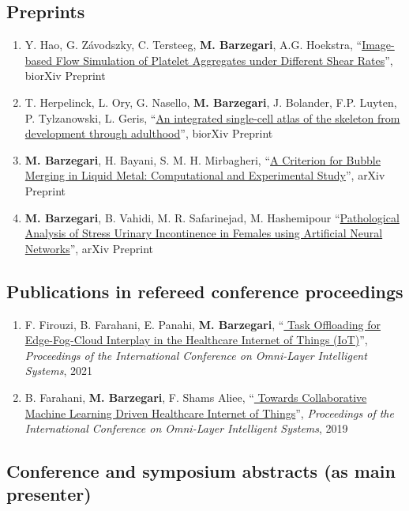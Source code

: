 \documentclass{cv}
\begin{document}
\subsection{Preprints}
\begin{enumerate}[itemsep=-0.2ex]
\item
Y. Hao, G. Závodszky, C. Tersteeg, \textbf{M. Barzegari}, A.G. Hoekstra, ``\href{https://doi.org/10.1101/2023.02.22.529480}{Image-based Flow Simulation of Platelet Aggregates under Different Shear Rates}'', biorXiv Preprint
\item
T. Herpelinck,  L. Ory,  G. Nasello, \textbf{M. Barzegari}, J. Bolander,  F.P. Luyten,  P. Tylzanowski,  L. Geris, ``\href{https://www.biorxiv.org/content/10.1101/2022.03.14.484345v2}{An integrated single-cell atlas of the skeleton from development through adulthood}'', biorXiv Preprint

\item
\textbf{M. Barzegari}, H. Bayani, S. M. H. Mirbagheri, ``\href{https://arxiv.org/abs/1708.01608}{A Criterion for Bubble Merging in Liquid Metal: Computational and Experimental Study}'', arXiv Preprint
\item
\textbf{M. Barzegari}, B. Vahidi, M. R. Safarinejad, M. Hashemipour ``\href{https://arxiv.org/abs/1803.01843}{Pathological Analysis of Stress Urinary Incontinence in Females using Artificial Neural Networks}'', arXiv Preprint
\end{enumerate}

\subsection{Publications in refereed conference proceedings}
\begin{enumerate}[itemsep=-0.2ex]
\item
F. Firouzi, B. Farahani, E. Panahi, \textbf{M. Barzegari}, ``\href{https://ieeexplore.ieee.org/abstract/document/9524098}{
Task Offloading for Edge-Fog-Cloud Interplay in the Healthcare Internet of Things (IoT)}'', \textit{Proceedings of the International Conference on Omni-Layer Intelligent Systems}, 2021
\item
B. Farahani, \textbf{M. Barzegari}, F. Shams Aliee, ``\href{https://dl.acm.org/citation.cfm?id=3312644}{
Towards Collaborative Machine Learning Driven Healthcare Internet of Things}'', \textit{Proceedings of the International Conference on Omni-Layer Intelligent Systems}, 2019 
\end{enumerate}

\subsection{Conference and symposium abstracts (as main presenter)}
\end{document}
